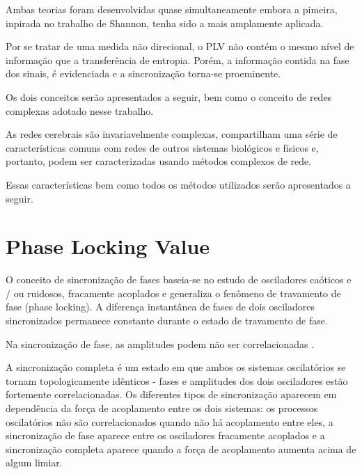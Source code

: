 \documentclass[
	12pt,				%
	openright,			%
	twoside,			%
	a4paper,			%
	english,			%
	french,				%
	spanish,			%
	brazil				%
	]{abntex2}
\begin{document}
Ambas teorias foram desenvolvidas quase simultaneamente embora a pimeira, inpirada no trabalho de Shannon, tenha sido a mais amplamente aplicada.

Por se tratar de uma medida não direcional, o PLV não contém o mesmo nível de informação que a transferência de entropia. Porém, a informação contida na fase dos sinais, é evidenciada e a sincronização torna-se proeminente.

Os dois conceitos serão apresentados a seguir, bem como o conceito de redes complexas adotado nesse trabalho. 

As redes cerebrais são invariavelmente complexas, compartilham uma série de características comuns com redes de outros sistemas biológicos e físicos e, portanto, podem ser caracterizadas usando métodos complexos de rede.

Essas características bem como todos os métodos utilizados serão apresentados a seguir.


\section{Phase Locking Value}
O conceito de sincronização de fases \cite{PhysRevLett.Rosenblum}
baseia-se no estudo de osciladores caóticos e / ou ruidosos, fracamente acoplados e generaliza o fenômeno de travamento de fase (phase locking). A diferença instantânea de fases de dois osciladores sincronizados permanece constante durante o estado de travamento de fase.

Na sincronização de fase, as amplitudes podem não ser correlacionadas \cite{PhysRevLett.Rosenblum}.

A sincronização completa é um estado em que ambos os sistemas oscilatórios se tornam topologicamente idênticos - fases e amplitudes dos dois osciladores estão fortemente correlacionadas. Os diferentes tipos de sincronização aparecem em dependência da força de acoplamento entre os dois sistemas: os processos oscilatórios não são correlacionados quando não há acoplamento entre eles, a sincronização de fase aparece entre os osciladores fracamente acoplados e a sincronização completa aparece quando a força de acoplamento aumenta acima de algum limiar.
\end{document}
